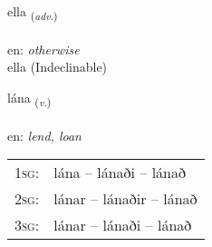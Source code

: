 \documentclass[frontgrid, backgrid]{flacards}\usepackage[]{graphicx}\usepackage[]{color}
\begin{document}

\renewcommand{\flhead}{\vskip5pt \fboxsep=0pt {\small\bfseries\footnotesize Atviksorð | Adverb}}
\renewcommand{\fcfoot}{\vskip5pt \fboxsep=0pt \hspace{2pt}{\small\bfseries\footnotesize 2K}}

\renewcommand{\blhead}{\vskip5pt {\small\bfseries\footnotesize Atviksorð | Adverb }}
\renewcommand{\bcfoot}{\vskip5pt \hspace{2pt}{\small\bfseries\footnotesize 2K}}


{ella \small{\textsubscript{(\textit{adv.})}} \\[1ex]
\textphonetic{[ɛtla]} \\
en: \emph{otherwise} \\  [2ex]
ella (Indeclinable)}

\renewcommand{\flhead}{\vskip5pt \fboxsep=0pt {\small\bfseries\footnotesize Sagnorð | Verb}}
\renewcommand{\fcfoot}{\vskip5pt \fboxsep=0pt \hspace{2pt}{\small\bfseries\footnotesize 2K}}

\renewcommand{\blhead}{\vskip5pt {\small\bfseries\footnotesize Sagnorð | Verb }}
\renewcommand{\bcfoot}{\vskip5pt \hspace{2pt}{\small\bfseries\footnotesize 2K}}


{lána \small{\textsubscript{(\textit{v.})}} \\[1ex] %
\textphonetic{[lauːna]} \\
en: \emph{lend, loan} \\  [2ex]
\renewcommand*{\arraystretch}{0.8}
\begin{tabular}{p{1cm}l}
\textsc{1sg}: & lána -- lánaði -- lánað \\ 
\textsc{2sg}: & lánar -- lánaðir -- lánað \\ 
\textsc{3sg}: & lánar -- lánaði -- lánað \\ 
\end{tabular}
}

\renewcommand{\flhead}{\vskip5pt \fboxsep=0pt {\small\bfseries\footnotesize Sagnorð | Verb}}
\renewcommand{\fcfoot}{\vskip5pt \fboxsep=0pt \hspace{2pt}{\small\bfseries\footnotesize 2K}}
\end{document}
